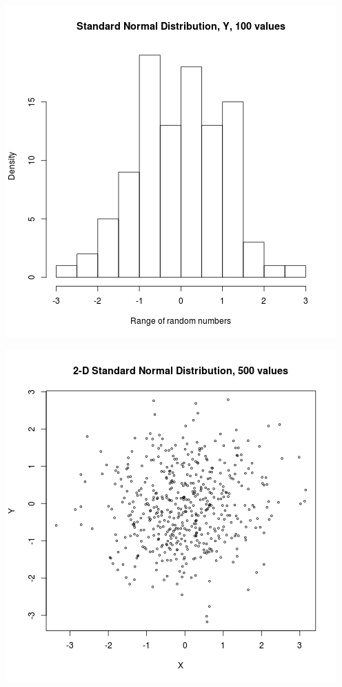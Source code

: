 \documentclass{article}
\begin{document}
\includegraphics{"plot2_1_Y"}
\pagebreak


\includegraphics{"plot2_2"}
\pagebreak
\end{document}
